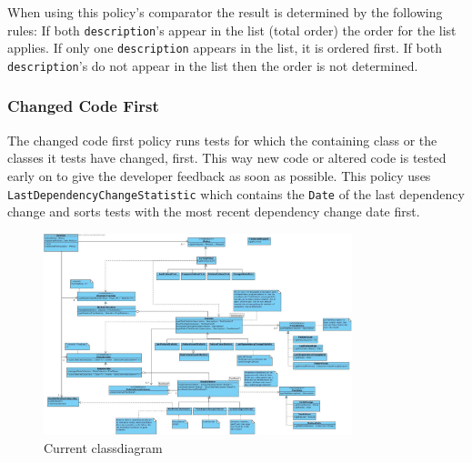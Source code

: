 \documentclass[i2]{oss}
\newcommand{\class}[1]{\texttt{#1}}
\begin{document}
When using this policy's comparator the result is determined by the 
following rules:
If both \class{description}'s appear in the list (total order) the order 
for the list applies.
If only one \class{description} appears in the list, it is ordered first.
If both \class{description}'s do not appear in the list then the order 
is not determined.

\subsubsection{Changed Code First}

The changed code first policy runs tests for which the containing class 
or the classes it tests have changed, first.
This way new code or altered code is tested early on to give the 
developer feedback as soon as possible.
This policy uses \class{LastDependencyChangeStatistic} which contains the
\class{Date} of the last dependency change and sorts tests with the most 
recent dependency change date first.


\begin{figure}[tbp]
\begin{center}
    \includegraphics[width=0.8\textwidth]{klassendiagram3}
    \caption{Current classdiagram}
	\label{fig:kd-h}
\end{center}
\end{figure}
\end{document}
